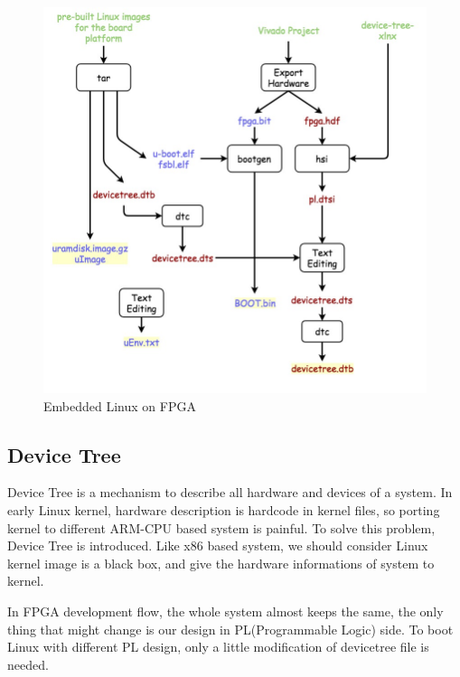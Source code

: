 \begin{figure}[!htb]
  \centering
  \includegraphics[scale=0.5]{images/embedded_linux.jpg}
  \caption[Embedded Linux on FPGA]{Embedded Linux on FPGA}
  \label{fig:Embedded Linux on FPGA}
\end{figure}



\subsection{Device Tree}
\label{subsec:Device Tree}

Device Tree is a mechanism to describe all hardware and devices of a system. In early Linux 
kernel, hardware description is hardcode in kernel files, so porting kernel to different
ARM-CPU based system is painful. To solve this problem, Device Tree is introduced. 
Like x86 based system, we should consider Linux kernel image is a black box, and give the 
hardware informations of system to kernel.
%

In FPGA development flow, the whole system almost keeps the same, the only thing that might change 
is our design in PL(Programmable Logic) side. To boot Linux with different PL design, only 
a little modification of devicetree file is needed.     


